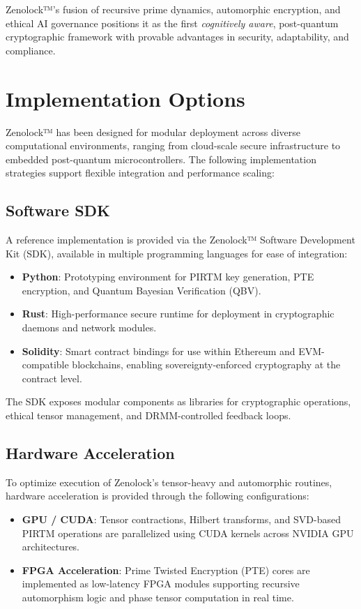 \documentclass{article}
\theoremstyle{plain}
\begin{document}
Zenolock™’s fusion of recursive prime dynamics, automorphic encryption, and ethical AI governance positions it as the first \textit{cognitively aware}, post-quantum cryptographic framework with provable advantages in security, adaptability, and compliance.

\section{Implementation Options}

Zenolock™ has been designed for modular deployment across diverse computational environments, ranging from cloud-scale secure infrastructure to embedded post-quantum microcontrollers. The following implementation strategies support flexible integration and performance scaling:

\subsection{Software SDK}

A reference implementation is provided via the Zenolock™ Software Development Kit (SDK), available in multiple programming languages for ease of integration:

\begin{itemize}
  \item \textbf{Python}: Prototyping environment for PIRTM key generation, PTE encryption, and Quantum Bayesian Verification (QBV).
  \item \textbf{Rust}: High-performance secure runtime for deployment in cryptographic daemons and network modules.
  \item \textbf{Solidity}: Smart contract bindings for use within Ethereum and EVM-compatible blockchains, enabling sovereignty-enforced cryptography at the contract level.
\end{itemize}

The SDK exposes modular components as libraries for cryptographic operations, ethical tensor management, and DRMM-controlled feedback loops.

\subsection{Hardware Acceleration}

To optimize execution of Zenolock's tensor-heavy and automorphic routines, hardware acceleration is provided through the following configurations:

\begin{itemize}
  \item \textbf{GPU / CUDA}: Tensor contractions, Hilbert transforms, and SVD-based PIRTM operations are parallelized using CUDA kernels across NVIDIA GPU architectures.
  \item \textbf{FPGA Acceleration}: Prime Twisted Encryption (PTE) cores are implemented as low-latency FPGA modules supporting recursive automorphism logic and phase tensor computation in real time.
\end{itemize}
\end{document}
